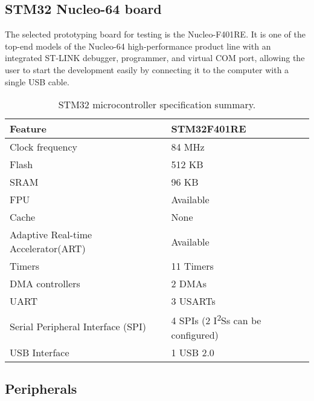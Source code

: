 \subsection{STM32 Nucleo-64 board}

The selected prototyping board for testing is the Nucleo-F401RE. It is one of the top-end models of the Nucleo-64 high-performance product line with an integrated ST-LINK debugger, programmer, and virtual COM port, allowing the user to start the development easily by connecting it to the computer with a single USB cable. 



\begin{table}[h!]
\begin{tabular}{|l|l|}
\hline
\textbf{Feature}                  & \textbf{STM32F401RE}             \\ \hline
Clock frequency                   & 84 MHz                           \\ \hline
Flash                             & 512 KB                           \\ \hline
SRAM                              & 96 KB                            \\ \hline
FPU                               & Available                        \\ \hline
Cache                             & None                             \\ \hline
Adaptive Real-time Accelerator(ART)    & Available                   \\ \hline
Timers                            & 11 Timers                        \\ \hline
DMA controllers                   & 2 DMAs                        \\ \hline
UART                              & 3 USARTs                         \\ \hline
Serial Peripheral Interface (SPI) & 4 SPIs (2 I\textsuperscript{2}Ss can be configured) \\ \hline
USB Interface                     & 1 USB 2.0                        \\ \hline
\end{tabular}

\caption{STM32 microcontroller specification summary.}
\end{table}


\subsection{Peripherals}

